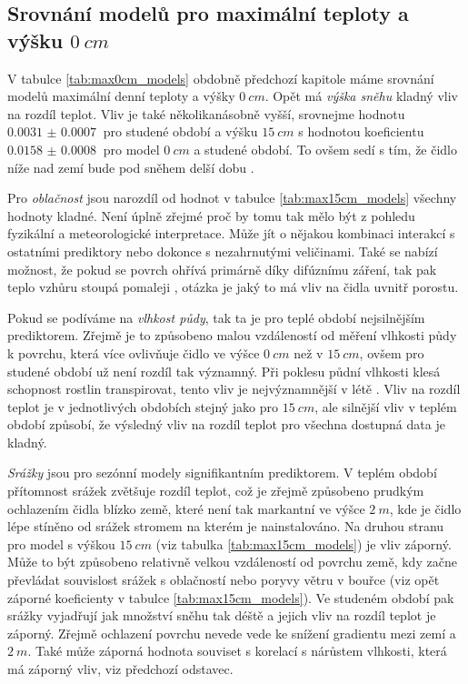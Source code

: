 \subsection{Srovnání modelů pro maximální teploty a výšku $\SI{0}{cm}$}
V tabulce \ref{tab:max0cm_models} obdobně předchozí kapitole máme srovnání modelů maximální denní teploty a výšky $\SI{0}{cm}$. Opět má \textit{výška sněhu} kladný vliv na rozdíl teplot. Vliv je také několikanásobně vyšší, srovnejme hodnotu $\SI{0.0031(7)}{}$ pro studené období a výšku $\SI{15}{cm}$ s hodnotou koeficientu $\SI{0.0158(8)}{}$ pro model $\SI{0}{cm}$ a studené období. To ovšem sedí s tím, že čidlo níže nad zemí bude pod sněhem delší dobu \parencite{snow_deFrenneForestMicroclimates}.

Pro \textit{oblačnost} jsou narozdíl od hodnot v tabulce \ref{tab:max15cm_models} všechny hodnoty kladné. Není úplně zřejmé proč by tomu tak mělo být z pohledu fyzikální a meteorologické interpretace. Může jít o nějakou kombinaci interakcí s ostatními prediktory nebo dokonce s nezahrnutými veličinami. Také se nabízí možnost, že pokud se povrch ohřívá primárně díky difúznímu záření, tak pak teplo vzhůru stoupá pomaleji \parencite{alma}, otázka je jaký to má vliv na čidla uvnitř porostu.

Pokud se podíváme na \textit{vlhkost půdy}, tak ta je pro teplé období nejsilnějším prediktorem. Zřejmě je to způsobeno malou vzdáleností od měření vlhkosti půdy k povrchu, která více ovlivňuje čidlo ve výšce $\SI{0}{cm}$ než v $\SI{15}{cm}$, ovšem pro studené období už není rozdíl tak významný. Při poklesu půdní vlhkosti klesá schopnost rostlin transpirovat, tento vliv je nejvýznamnější v létě \parencite{snow_deFrenneForestMicroclimates}. Vliv na rozdíl teplot je v jednotlivých obdobích stejný jako pro $\SI{15}{cm}$, ale silnější vliv v teplém období způsobí, že výsledný vliv na rozdíl teplot pro všechna dostupná data je kladný.

\textit{Srážky} jsou pro sezónní modely signifikantním prediktorem. V teplém období přítomnost srážek zvětšuje rozdíl teplot, což je zřejmě způsobeno prudkým ochlazením čidla blízko země, které není tak markantní ve výšce $\SI{2}{m}$, kde je čidlo lépe stíněno od srážek stromem na kterém je nainstalováno. Na druhou stranu pro model s výškou $\SI{15}{cm}$ (viz tabulka \ref{tab:max15cm_models}) je vliv záporný. Může to být způsobeno relativně velkou vzdáleností od povrchu země, kdy začne převládat souvislost srážek s oblačností nebo poryvy větru v bouřce (viz opět záporné koeficienty v tabulce \ref{tab:max15cm_models}). Ve studeném období pak srážky vyjadřují jak množství sněhu tak déště a jejich vliv na rozdíl teplot je záporný. Zřejmě ochlazení povrchu nevede vede ke snížení gradientu mezi zemí a $\SI{2}{m}$. Také může záporná hodnota souviset s korelací s nárůstem vlhkosti, která má záporný vliv, viz předchozí odstavec.

